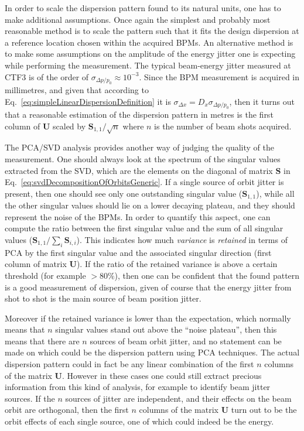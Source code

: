 In order to scale the dispersion pattern found to its natural units, one has to make
additional assumptions.
Once again the simplest and probably most reasonable method is to scale the pattern such
that it fits the design dispersion at a reference location chosen within the acquired
BPMs.
An alternative method is to make some assumptions on the amplitude of the energy jitter
one is expecting while performing the measurement.
The typical beam-energy jitter measured at CTF3 is of the order of $\sigma_{\Delta p /
p_0} \approx 10^{-3}$. 
Since the BPM measurement is acquired in millimetres, and given that according to
Eq.~\ref{eq:simpleLinearDispersionDefinition} it is $\sigma_{\Delta x} = D_x
\sigma_{\Delta p / p_0}$, 
then it turns out that a reasonable estimation of the dispersion pattern in metres is
the first column of $\mathbf{U}$ scaled by $\mathbf{S}_{1,1}/\sqrt{n}$ where $n$ is the
number of beam shots acquired.

The PCA/SVD analysis provides another way of judging the quality of the measurement.
One should always look at the spectrum of the singular values extracted from the SVD,
which are the elements on the diagonal of matrix $\mathbf{S}$ in
Eq.~\ref{eq:svdDecompositionOfOrbitsGeneric}.
If a single source of orbit jitter is present, then one should see only one outstanding
singular value ($\mathbf{S}_{1,1}$),
while all the other singular values should lie on a lower decaying plateau, and they
should represent the noise of the BPMs.
In order to quantify this aspect, one can compute the ratio between the first singular
value and the sum of all singular values ($\mathbf{S}_{1,1}/\sum_i \mathbf{S}_{i,i}$).
This indicates how much \emph{variance} is \emph{retained} in terms of PCA by the first
singular value and the associated singular direction (first column of matrix
$\mathbf{U}$).
If the ratio of the retained variance is above a certain threshold (for example 
$>80\%$), then one can be confident that the found pattern is a good measurement of
dispersion,
given of course that the energy jitter from shot to shot is the main source of beam
position jitter.

Moreover if the retained variance is lower than the expectation, which normally means
that $n$ singular values stand out above the ``noise plateau'',
then this means that there are $n$ sources of beam orbit jitter, and no statement can be
made on which could be the dispersion pattern using PCA techniques.
The actual dispersion pattern could in fact be any linear combination of the first $n$
columns of the matrix $\mathbf{U}$.
However in these cases one could still extract precious information from this kind of
analysis, for example to identify beam jitter sources. 
If the $n$ sources of jitter are independent, and their effects on the beam orbit are
orthogonal,
then the first $n$  columns of the matrix $\mathbf{U}$ turn out to be the orbit effects
of each single source, one of which could indeed be the energy.

